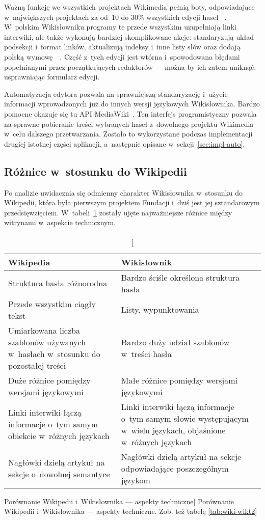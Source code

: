 Ważną funkcję we wszystkich projektach Wikimedia pełnią boty, odpowiadające w~największych projektach za od~10 do 30\% wszystkich edycji haseł ~\cite{bots}. W~polskim Wikisłowniku programy te przede wszystkim uzupełniają linki interwiki, ale także wykonują bardziej skomplikowane akcje: standaryzują układ podsekcji i~format linków, aktualizują indeksy i~inne listy słów oraz dodają polską wymowę~\cite{wikt:boty}~\cite{wikt:olafbot}. Część z~tych edycji jest wtórna i~spowodowana błędami popełnianymi przez początkujących redaktorów --- można by ich zatem uniknąć, usprawniając formularz edycji.

Automatyzacja edytora pozwala na sprawniejszą standaryzację i~użycie informacji wprowadzonych już do innych wersji językowych Wikisłownika. Bardzo pomocne okazuje się tu API MediaWiki~\cite{mw:api}. Ten interfejs programistyczny pozwala na sprawne pobieranie treści wybranych haseł z~dowolnego projektu Wikimedia w~celu dalszego przetwarzania. Zostało to wykorzystane podczas implementacji drugiej istotnej części aplikacji, a~następnie opisane w~sekcji~\ref{sec:impl-auto}.


\subsection{Różnice w~stosunku do Wikipedii}
\label{subs:wiki-wikt}
Po analizie uwidacznia się odmienny charakter Wikisłownika w~stosunku do Wikipedii, która była pierwszym projektem Fundacji i~dziś jest jej sztandarowym przedsięwzięciem. W~tabeli~\ref{tab:wiki-wikt} zostały ujęte najważniejsze różnice między witrynami w~aspekcie technicznym.
\begin{table}[h]
\begin{center}
	\begin{tabularx}{\textwidth}{ XX }
		\toprule \textbf{Wikipedia} & \textbf{Wikisłownik} \\
		\toprule Struktura hasła różnorodna
			& Bardzo ściśle określona struktura hasła \\
		\midrule Przede wszystkim ciągły tekst
			& Listy, wypunktowania \\
		\midrule Umiarkowana liczba szablonów używanych w~hasłach w~stosunku do pozostałej treści
			& Bardzo duży udział szablonów w~treści hasła \\
		\midrule Duże różnice pomiędzy wersjami językowymi
			& Małe różnice pomiędzy wersjami językowymi \\
		\midrule Linki interwiki łączą informacje o~tym samym obiekcie w~różnych językach
			& Linki interwiki łączą informacje o~tym samym słowie występującym w~wielu językach, objaśnione w~różnych językach \\
		\midrule Nagłówki dzielą artykuł na sekcje o~dowolnej semantyce
			& Nagłówki dzielą artykuł na sekcje odpowiadające poszczególnym językom \\
		\bottomrule
	\end{tabularx}
\caption
	[Porównanie Wikipedii i~Wikisłownika --- aspekty techniczne]
	{Porównanie Wikipedii i~Wikisłownika --- aspekty techniczne. Zob. też tabelę \ref{tab:wiki-wikt2}}
\label{tab:wiki-wikt}
\end{center}
\end{table}

